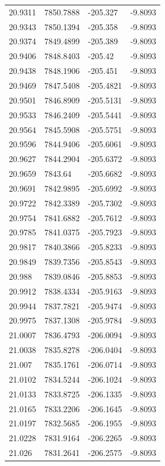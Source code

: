 \begin{table}[H]
\begin{tabular}{llll}
20.9311 & 7850.7888 & -205.327 & -9.8093 \\
20.9343 & 7850.1394 & -205.358 & -9.8093 \\
20.9374 & 7849.4899 & -205.389 & -9.8093 \\
20.9406 & 7848.8403 & -205.42 & -9.8093 \\
20.9438 & 7848.1906 & -205.451 & -9.8093 \\
20.9469 & 7847.5408 & -205.4821 & -9.8093 \\
20.9501 & 7846.8909 & -205.5131 & -9.8093 \\
20.9533 & 7846.2409 & -205.5441 & -9.8093 \\
20.9564 & 7845.5908 & -205.5751 & -9.8093 \\
20.9596 & 7844.9406 & -205.6061 & -9.8093 \\
20.9627 & 7844.2904 & -205.6372 & -9.8093 \\
20.9659 & 7843.64 & -205.6682 & -9.8093 \\
20.9691 & 7842.9895 & -205.6992 & -9.8093 \\
20.9722 & 7842.3389 & -205.7302 & -9.8093 \\
20.9754 & 7841.6882 & -205.7612 & -9.8093 \\
20.9785 & 7841.0375 & -205.7923 & -9.8093 \\
20.9817 & 7840.3866 & -205.8233 & -9.8093 \\
20.9849 & 7839.7356 & -205.8543 & -9.8093 \\
20.988 & 7839.0846 & -205.8853 & -9.8093 \\
20.9912 & 7838.4334 & -205.9163 & -9.8093 \\
20.9944 & 7837.7821 & -205.9474 & -9.8093 \\
20.9975 & 7837.1308 & -205.9784 & -9.8093 \\
21.0007 & 7836.4793 & -206.0094 & -9.8093 \\
21.0038 & 7835.8278 & -206.0404 & -9.8093 \\
21.007 & 7835.1761 & -206.0714 & -9.8093 \\
21.0102 & 7834.5244 & -206.1024 & -9.8093 \\
21.0133 & 7833.8725 & -206.1335 & -9.8093 \\
21.0165 & 7833.2206 & -206.1645 & -9.8093 \\
21.0197 & 7832.5685 & -206.1955 & -9.8093 \\
21.0228 & 7831.9164 & -206.2265 & -9.8093 \\
21.026 & 7831.2641 & -206.2575 & -9.8093 \\

\end{tabular}
\end{table}
